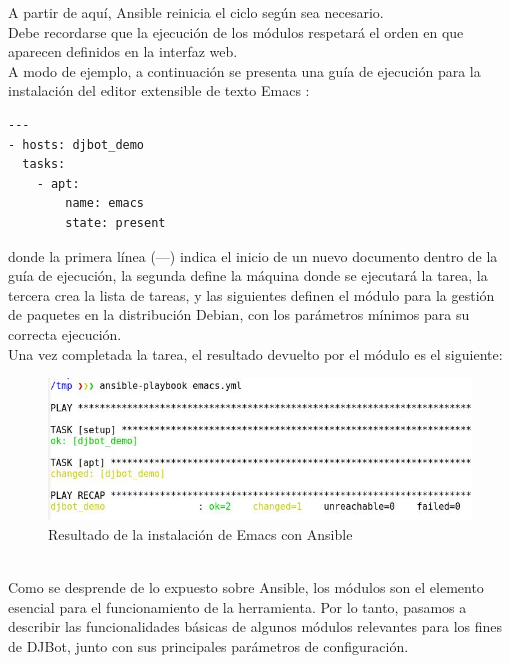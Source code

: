 \documentclass[a4paper,12pt]{article}
\begin{document}
A partir de aquí, Ansible reinicia el ciclo según sea necesario.\\

Debe recordarse que la ejecución de los módulos respetará el orden en que aparecen definidos en la interfaz web.\\

A modo de ejemplo, a continuación se presenta una guía de ejecución para la instalación del editor extensible de texto Emacs \cite{Emacs}:\\

\begin{verbatim}
---
- hosts: djbot_demo
  tasks:
    - apt:
        name: emacs
        state: present
\end{verbatim}


donde la primera línea (---) indica el inicio de un nuevo documento dentro de la guía de ejecución, la segunda define la máquina donde se ejecutará la tarea, la tercera crea la lista de tareas, y las siguientes definen el módulo para la gestión de paquetes en la distribución Debian, con los parámetros mínimos para su correcta ejecución.\\

Una vez completada la tarea, el resultado devuelto por el módulo es el siguiente:\\

\begin{figure}[htb]
\centering
\includegraphics[width=.9\linewidth]{./img/ansible-emacs-execution.jpg}
\caption{Resultado de la instalación de Emacs con Ansible}
\end{figure}\\


Como se desprende de lo expuesto sobre Ansible, los módulos son el elemento esencial para el funcionamiento de la herramienta. Por lo tanto, pasamos a describir las funcionalidades básicas de algunos módulos relevantes para los fines de DJBot, junto con sus principales parámetros de configuración.\\
\end{document}
